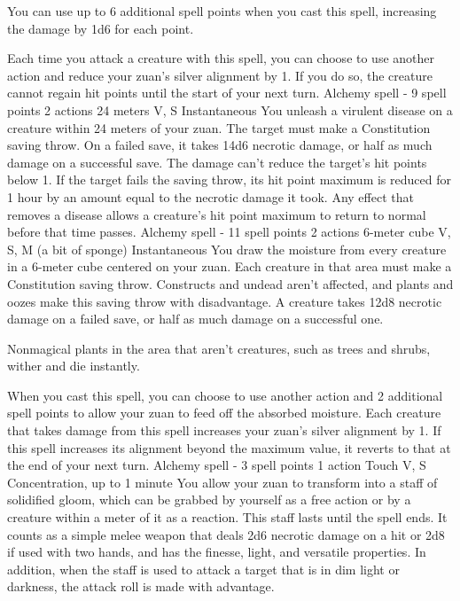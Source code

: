         You can use up to 6 additional spell points when you cast this spell, increasing the damage by 1d6 for each point.

        Each time you attack a creature with this spell, you can choose to use another action and reduce your zuan's silver alignment by 1.
        If you do so, the creature cannot regain hit points until the start of your next turn.
        {Alchemy spell - 9 spell points}
        {2 actions}
        {24 meters}
        {V, S}
        {Instantaneous}
        You unleash a virulent disease on a creature within 24 meters of your zuan.
        The target must make a Constitution saving throw.
        On a failed save, it takes 14d6 necrotic damage, or half as much damage on a successful save.
        The damage can't reduce the target's hit points below 1.
        If the target fails the saving throw, its hit point maximum is reduced for 1 hour by an amount equal to the necrotic damage it took.
        Any effect that removes a disease allows a creature's hit point maximum to return to normal before that time passes.
        {Alchemy spell - 11 spell points}
        {2 actions}
        {6-meter cube}
        {V, S, M (a bit of sponge)}
        {Instantaneous}
        You draw the moisture from every creature in a 6-meter cube centered on your zuan.
        Each creature in that area must make a Constitution saving throw.
        Constructs and undead aren't affected, and plants and oozes make this saving throw with disadvantage.
        A creature takes 12d8 necrotic damage on a failed save, or half as much damage on a successful one.

        Nonmagical plants in the area that aren't creatures, such as trees and shrubs, wither and die instantly.

        When you cast this spell, you can choose to use another action and 2 additional spell points to allow your zuan to feed off the absorbed moisture.
        Each creature that takes damage from this spell increases your zuan's silver alignment by 1.
        If this spell increases its alignment beyond the maximum value, it reverts to that at the end of your next turn.
        {Alchemy spell - 3 spell points}
        {1 action}
        {Touch}
        {V, S}
        {Concentration, up to 1 minute}
        You allow your zuan to transform into a staff of solidified gloom, which can be grabbed by yourself as a free action or by a creature within a meter of it as a reaction.
        This staff lasts until the spell ends.
        It counts as a simple melee weapon that deals 2d6 necrotic damage on a hit or 2d8 if used with two hands, and has the finesse, light, and versatile properties.
        In addition, when the staff is used to attack a target that is in dim light or darkness, the attack roll is made with advantage.

